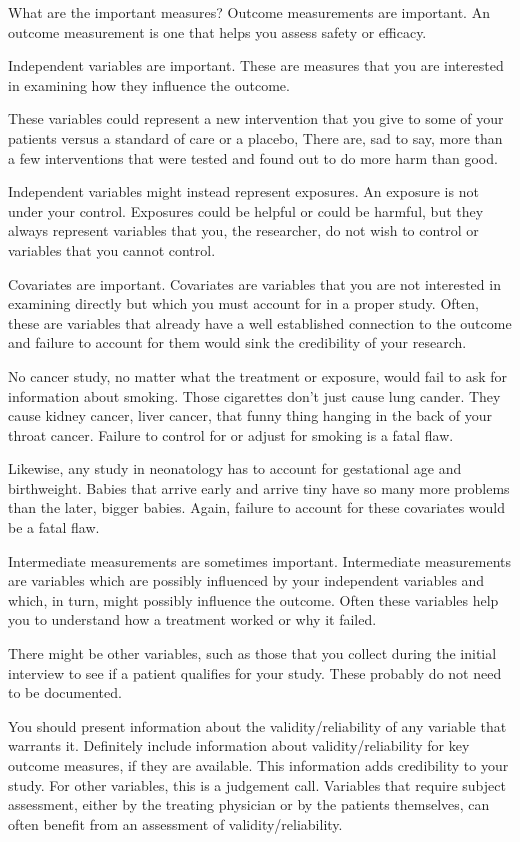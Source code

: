 \documentclass[
  letterpaper,
  DIV=11,
  numbers=noendperiod]{scrreprt}
\begin{document}
What are the important measures? Outcome measurements are important. An
outcome measurement is one that helps you assess safety or efficacy.

Independent variables are important. These are measures that you are
interested in examining how they influence the outcome.

These variables could represent a new intervention that you give to some
of your patients versus a standard of care or a placebo, There are, sad
to say, more than a few interventions that were tested and found out to
do more harm than good.

Independent variables might instead represent exposures. An exposure is
not under your control. Exposures could be helpful or could be harmful,
but they always represent variables that you, the researcher, do not
wish to control or variables that you cannot control.

Covariates are important. Covariates are variables that you are not
interested in examining directly but which you must account for in a
proper study. Often, these are variables that already have a well
established connection to the outcome and failure to account for them
would sink the credibility of your research.

No cancer study, no matter what the treatment or exposure, would fail to
ask for information about smoking. Those cigarettes don't just cause
lung cander. They cause kidney cancer, liver cancer, that funny thing
hanging in the back of your throat cancer. Failure to control for or
adjust for smoking is a fatal flaw.

Likewise, any study in neonatology has to account for gestational age
and birthweight. Babies that arrive early and arrive tiny have so many
more problems than the later, bigger babies. Again, failure to account
for these covariates would be a fatal flaw.

Intermediate measurements are sometimes important. Intermediate
measurements are variables which are possibly influenced by your
independent variables and which, in turn, might possibly influence the
outcome. Often these variables help you to understand how a treatment
worked or why it failed.

There might be other variables, such as those that you collect during
the initial interview to see if a patient qualifies for your study.
These probably do not need to be documented.

You should present information about the validity/reliability of any
variable that warrants it. Definitely include information about
validity/reliability for key outcome measures, if they are available.
This information adds credibility to your study. For other variables,
this is a judgement call. Variables that require subject assessment,
either by the treating physician or by the patients themselves, can
often benefit from an assessment of validity/reliability.
\end{document}

